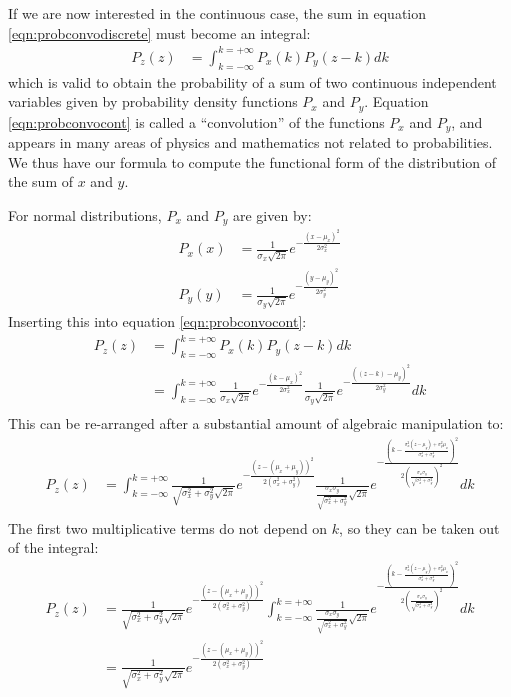 If we are now interested in the continuous case, the sum in equation \ref{eqn:probconvodiscrete} must become an integral:
\begin{align}
\label{eqn:probconvocont}
P_z(z)&=\int_{k=-\infty}^{k=+\infty}P_x(k)P_y(z-k)dk
\end{align}
which is valid to obtain the probability of a sum of two continuous independent variables given by probability density functions $P_x$ and $P_y$. Equation \ref{eqn:probconvocont} is called a ``convolution'' of the functions $P_x$ and $P_y$, and appears in many areas of physics and mathematics not related to probabilities. We thus have our formula to compute the functional form of the distribution of the sum of $x$ and $y$.

For normal distributions, $P_x$ and $P_y$ are given by:
\begin{align*}
P_x(x)&=\frac{1}{\sigma_x\sqrt{2\pi}}e^{-\frac{(x-\mu_x)^2}{2\sigma_x^2}}\\
P_y(y)&=\frac{1}{\sigma_y\sqrt{2\pi}}e^{-\frac{(y-\mu_y)^2}{2\sigma_y^2}}
\end{align*}
Inserting this into equation \ref{eqn:probconvocont}:
\begin{align*}
P_z(z)&=\int_{k=-\infty}^{k=+\infty}P_x(k)P_y(z-k)dk\\
&=\int_{k=-\infty}^{k=+\infty}\frac{1}{\sigma_x\sqrt{2\pi}}e^{-\frac{(k-\mu_x)^2}{2\sigma_x^2}}\frac{1}{\sigma_y\sqrt{2\pi}}e^{-\frac{((z-k)-\mu_y)^2}{2\sigma_y^2}}dk\\
\end{align*}
This can be re-arranged after a substantial amount of algebraic manipulation to:
\begin{align*}
P_z(z)&=\int_{k=-\infty}^{k=+\infty}\frac{1}{\sqrt{\sigma_x^2+\sigma_y^2}\sqrt{2\pi}}e^{-\frac{(z-(\mu_x+\mu_y))^2}{2(\sigma_x^2+\sigma_y^2)}}\frac{1}{\frac{\sigma_x\sigma_y}{\sqrt{\sigma_x^2+\sigma_y^2}}\sqrt{2\pi}}e^{-\frac{\left(k-\frac{\sigma_x^2(z-\mu_y)+\sigma_y^2\mu_x}{\sigma_x^2+\sigma_y^2}\right)^2}{2\left(\frac{\sigma_x\sigma_y}{\sqrt{\sigma_x^2+\sigma_y^2}}\right)^2}}dk\\
\end{align*}
The first two multiplicative terms do not depend on $k$, so they can be taken out of the integral:
\begin{align*}
P_z(z)&=\frac{1}{\sqrt{\sigma_x^2+\sigma_y^2}\sqrt{2\pi}}e^{-\frac{(z-(\mu_x+\mu_y))^2}{2(\sigma_x^2+\sigma_y^2)}}\int_{k=-\infty}^{k=+\infty}\frac{1}{\frac{\sigma_x\sigma_y}{\sqrt{\sigma_x^2+\sigma_y^2}}\sqrt{2\pi}}e^{-\frac{\left(k-\frac{\sigma_x^2(z-\mu_y)+\sigma_y^2\mu_x}{\sigma_x^2+\sigma_y^2}\right)^2}{2\left(\frac{\sigma_x\sigma_y}{\sqrt{\sigma_x^2+\sigma_y^2}}\right)^2}}dk\\
&=\frac{1}{\sqrt{\sigma_x^2+\sigma_y^2}\sqrt{2\pi}}e^{-\frac{(z-(\mu_x+\mu_y))^2}{2(\sigma_x^2+\sigma_y^2)}}
\end{align*}
